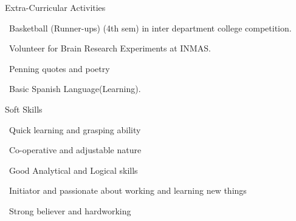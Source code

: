 \documentclass{resume} %
\begin{document}
\begin{rSection}{Extra-Curricular Activities} \itemsep -3pt
	\item \textbullet \ Basketball (Runner-ups) (4th sem) in inter department college competition.
	\item \textbullet \ Volunteer for Brain Research Experiments at INMAS.
	\item \textbullet \ Penning quotes and poetry
	\item \textbullet \ Basic Spanish Language(Learning).
\end{rSection}

\begin{rSection}{Soft Skills}
  \itemsep -3pt
 \item \textbullet \ Quick learning and grasping ability
 \item \textbullet \ Co-operative and adjustable nature
 \item \textbullet \ Good Analytical and Logical skills 
 \item \textbullet \ Initiator and passionate about working and learning new things 
 \item \textbullet \ Strong believer and hardworking
\end{rSection}
\end{document}
